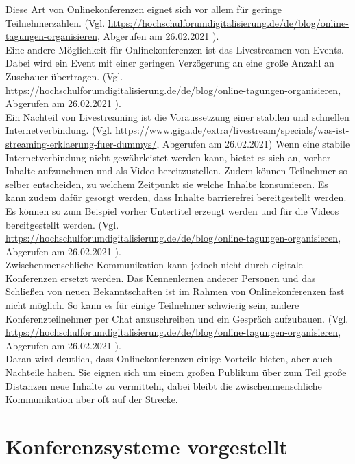 Diese Art von Onlinekonferenzen eignet sich vor allem für geringe Teilnehmerzahlen.
(Vgl. \url{https://hochschulforumdigitalisierung.de/de/blog/online-tagungen-organisieren}, Abgerufen am 26.02.2021 ).
\\
Eine andere Möglichkeit für Onlinekonferenzen ist das Livestreamen von Events.
Dabei wird ein Event mit einer geringen Verzögerung an eine große Anzahl an Zuschauer übertragen.
(Vgl. \url{https://hochschulforumdigitalisierung.de/de/blog/online-tagungen-organisieren}, Abgerufen am 26.02.2021 ).
\\
Ein Nachteil von Livestreaming ist die Voraussetzung einer stabilen und schnellen Internetverbindung.
(Vgl. \url{https://www.giga.de/extra/livestream/specials/was-ist-streaming-erklaerung-fuer-dummys/}, Abgerufen am 26.02.2021)
Wenn eine stabile Internetverbindung nicht gewährleistet werden kann, bietet es sich an, vorher Inhalte aufzunehmen und als Video bereitzustellen.
Zudem können Teilnehmer so selber entscheiden, zu welchem Zeitpunkt sie welche Inhalte konsumieren.
Es kann zudem dafür gesorgt werden, dass Inhalte barrierefrei bereitgestellt werden.
Es können so zum Beispiel vorher Untertitel erzeugt werden und für die Videos bereitgestellt werden.
(Vgl. \url{https://hochschulforumdigitalisierung.de/de/blog/online-tagungen-organisieren}, Abgerufen am 26.02.2021 ).
\\
Zwischenmenschliche Kommunikation kann jedoch nicht durch digitale Konferenzen ersetzt werden.
Das Kennenlernen anderer Personen und das Schließen von neuen Bekanntschaften ist im Rahmen von Onlinekonferenzen fast nicht möglich.
So kann es für einige Teilnehmer schwierig sein, andere Konferenzteilnehmer per Chat anzuschreiben und ein Gespräch aufzubauen.
(Vgl. \url{https://hochschulforumdigitalisierung.de/de/blog/online-tagungen-organisieren}, Abgerufen am 26.02.2021 ).
\\
Daran wird deutlich, dass Onlinekonferenzen einige Vorteile bieten, aber auch Nachteile haben.
Sie eignen sich um einem großen Publikum über zum Teil große Distanzen neue Inhalte zu vermitteln, dabei bleibt die zwischenmenschliche Kommunikation aber oft auf der Strecke.

\section{Konferenzsysteme vorgestellt}
\label{sec:konferenzsysteme_vorgestellt}

